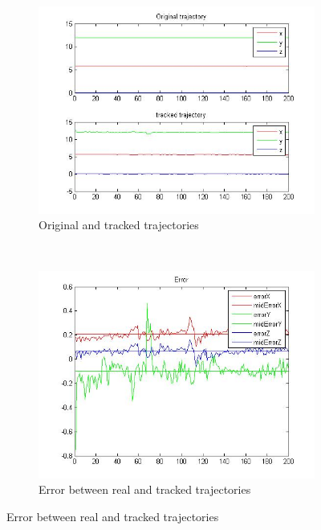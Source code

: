 	
	\begin{figure}[ht]
		\centering
		\begin{subfigure}[ht]{0.45\linewidth}
			\centering
				\includegraphics[width=\linewidth]{../Images/c4/trajs}
				\caption{Original and tracked trajectories}
				\label{fig:trajectories_PC}
		\end{subfigure}
		~
		\begin{subfigure}[ht]{0.45\linewidth}
			\centering
			\includegraphics[width=\linewidth]{../Images/c4/errors}
			\caption{Error between real and tracked trajectories}
			\label{fig:errors_PC}
		\end{subfigure}
	\end{figure}
			
